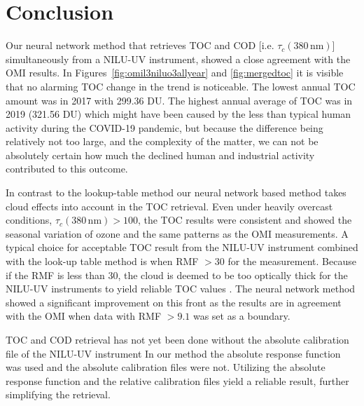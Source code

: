 \documentclass{optica-article}
\begin{document}
\section{Conclusion}
\label{sec-conclusion}

Our neural network method that retrieves TOC and COD [i.e. $\tau_c{\scriptstyle(380 \, \text{nm})}$] simultaneously from a NILU-UV instrument, showed a close agreement with the OMI results.
In Figures~\ref{fig:omil3niluo3allyear} and \ref{fig:mergedtoc} it is visible that no alarming TOC change in the trend is noticeable. 
The lowest annual TOC amount was in 2017 with 299.36 DU. 
The highest annual average of TOC was in 2019 (321.56 DU) which might have been caused by the less than typical human activity during the COVID-19 pandemic, but because the difference being relatively not too large, and the complexity of the matter, we can not be absolutely certain how much the declined human and industrial activity contributed to this outcome.

In contrast to the lookup-table method our neural network based method takes cloud effects into account in the TOC retrieval.
Even under heavily overcast conditions, $\tau_c{\scriptstyle(380 \, \text{nm})} > 100$, the TOC results were consistent and  showed the seasonal variation of ozone and the same patterns as the OMI measurements.
A typical choice for acceptable TOC result from the NILU-UV instrument combined with the look-up table method is when RMF $>30$ for the measurement. 
Because if the RMF is less than 30, the cloud is deemed to be too optically thick for the NILU-UV instruments to yield reliable TOC values \cite{Fan:2014b}.
The neural network method showed a significant improvement on this front as the results are in agreement with the OMI when data with RMF $>9.1$ was set as a boundary.

TOC and COD retrieval has not yet been done without the absolute calibration file of the NILU-UV instrument
In our method the absolute response function was used and the absolute calibration files were not. 
Utilizing the absolute response function and the relative calibration files yield a reliable result, further simplifying the retrieval. 
\end{document}
